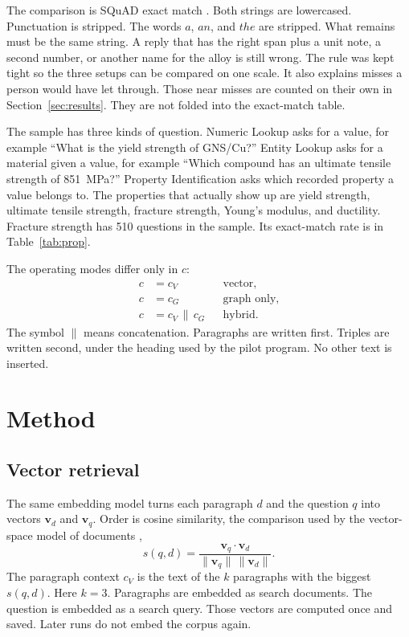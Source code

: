 \documentclass[conference]{IEEEtran}
\begin{document}
The comparison is SQuAD exact match \cite{rajpurkar2016squad,rajpurkar2018squad2}. Both strings are lowercased. Punctuation is stripped. The words \(a\), \(an\), and \(the\) are stripped. What remains must be the same string. A reply that has the right span plus a unit note, a second number, or another name for the alloy is still wrong. The rule was kept tight so the three setups can be compared on one scale. It also explains misses a person would have let through. Those near misses are counted on their own in Section~\ref{sec:results}. They are not folded into the exact-match table.

The sample has three kinds of question. Numeric Lookup asks for a value, for example ``What is the yield strength of GNS/Cu?'' Entity Lookup asks for a material given a value, for example ``Which compound has an ultimate tensile strength of 851~MPa?'' Property Identification asks which recorded property a value belongs to. The properties that actually show up are yield strength, ultimate tensile strength, fracture strength, Young's modulus, and ductility. Fracture strength has 510 questions in the sample. Its exact-match rate is in Table~\ref{tab:prop}.

The operating modes differ only in \(c\):
\begin{align}
c &= c_V && \text{vector}, \\
c &= c_G && \text{graph only}, \\
c &= c_V \,\|\, c_G && \text{hybrid}.
\end{align}
The symbol \(\|\) means concatenation. Paragraphs are written first. Triples are written second, under the heading used by the pilot program. No other text is inserted.

\section{Method}
\subsection{Vector retrieval}
The same embedding model turns each paragraph \(d\) and the question \(q\) into vectors \(\mathbf{v}_d\) and \(\mathbf{v}_q\). Order is cosine similarity, the comparison used by the vector-space model of documents \cite{salton1975vsm,manning2008ir},
\begin{equation}
s(q,d) = \frac{\mathbf{v}_q \cdot \mathbf{v}_d}{\|\mathbf{v}_q\|\,\|\mathbf{v}_d\|}.
\end{equation}
The paragraph context \(c_V\) is the text of the \(k\) paragraphs with the biggest \(s(q,d)\). Here \(k=3\). Paragraphs are embedded as search documents. The question is embedded as a search query. Those vectors are computed once and saved. Later runs do not embed the corpus again.
\end{document}
